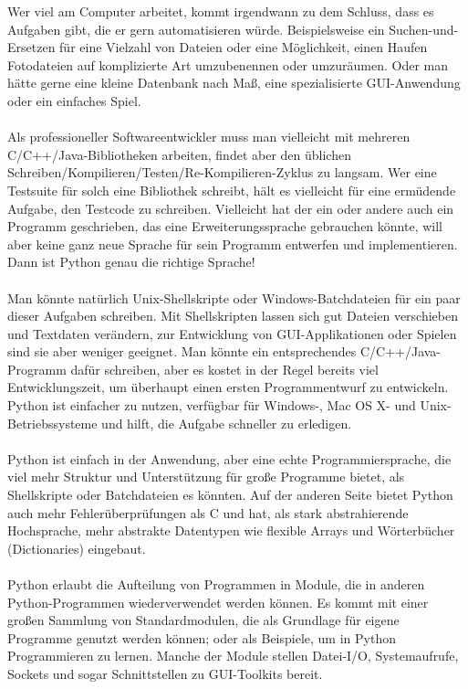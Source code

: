 Wer viel am Computer arbeitet, kommt irgendwann zu dem Schluss, dass es Aufgaben gibt, die er gern automatisieren würde. Beispielsweise ein Suchen-und-Ersetzen für eine Vielzahl von Dateien oder eine Möglichkeit, einen Haufen Fotodateien auf komplizierte Art umzubenennen oder umzuräumen. Oder man hätte gerne eine kleine Datenbank nach Maß, eine spezialisierte GUI-Anwendung oder ein einfaches Spiel.\\
\\
Als professioneller Softwareentwickler muss man vielleicht mit mehreren C/C++/Java-Bibliotheken arbeiten, findet aber den üblichen Schreiben/Kompilieren/Testen/Re-Kompilieren-Zyklus zu langsam. Wer eine Testsuite für solch eine Bibliothek schreibt, hält es vielleicht für eine ermüdende Aufgabe, den Testcode zu schreiben. Vielleicht hat der ein oder andere auch ein Programm geschrieben, das eine Erweiterungssprache gebrauchen könnte, will aber keine ganz neue Sprache für sein Programm entwerfen und implementieren. Dann ist Python genau die richtige Sprache!\\
\\
Man könnte natürlich Unix-Shellskripte oder Windows-Batchdateien für ein paar dieser Aufgaben schreiben. Mit Shellskripten lassen sich gut Dateien verschieben und Textdaten verändern, zur Entwicklung von GUI-Applikationen oder Spielen sind sie aber weniger geeignet. Man könnte ein entsprechendes C/C++/Java-Programm dafür schreiben, aber es kostet in der Regel bereits viel Entwicklungszeit, um überhaupt einen ersten Programmentwurf zu entwickeln. Python ist einfacher zu nutzen, verfügbar für Windows-, Mac OS X- und Unix-Betriebssysteme und hilft, die Aufgabe schneller zu erledigen.\\
\\
Python ist einfach in der Anwendung, aber eine echte Programmiersprache, die viel mehr Struktur und Unterstützung für große Programme bietet, als Shellskripte oder Batchdateien es könnten. Auf der anderen Seite bietet Python auch mehr Fehlerüberprüfungen als C und hat, als stark abstrahierende Hochsprache, mehr abstrakte Datentypen wie flexible Arrays und Wörterbücher (Dictionaries) eingebaut.\\
\\
Python erlaubt die Aufteilung von Programmen in Module, die in anderen Python-Programmen wiederverwendet werden können. Es kommt mit einer großen Sammlung von Standardmodulen, die als Grundlage für eigene Programme genutzt werden können; oder als Beispiele, um in Python Programmieren zu lernen. Manche der Module stellen Datei-I/O, Systemaufrufe, Sockets und sogar Schnittstellen zu GUI-Toolkits bereit.\\
